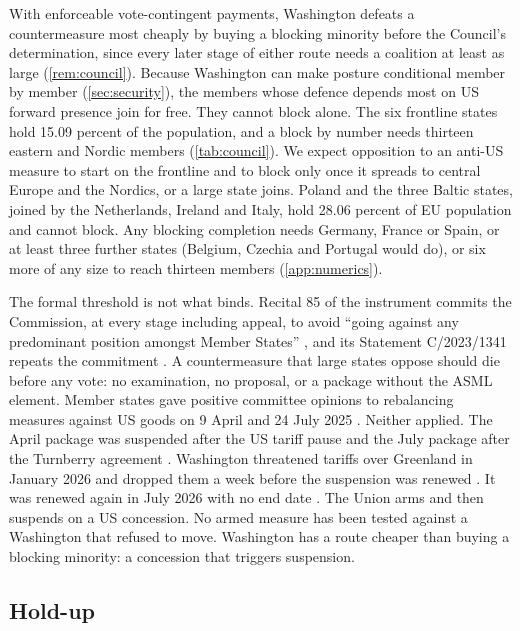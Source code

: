 With enforceable vote-contingent payments, Washington defeats a countermeasure most cheaply by buying a blocking minority before the Council's determination, since every later stage of either route needs a coalition at least as large (\cref{rem:council}). Because Washington can make posture conditional member by member (\cref{sec:security}), the members whose defence depends most on US forward presence join for free. They cannot block alone. The six frontline states hold 15.09 percent of the population, and a block by number needs thirteen eastern and Nordic members (\cref{tab:council}). We expect opposition to an anti-US measure to start on the frontline and to block only once it spreads to central Europe and the Nordics, or a large state joins. Poland and the three Baltic states, joined by the Netherlands, Ireland and Italy, hold 28.06 percent of EU population \citep{council2025population} and cannot block. Any blocking completion needs Germany, France or Spain, or at least three further states (Belgium, Czechia and Portugal would do), or six more of any size to reach thirteen members (\cref{app:numerics}).

The formal threshold is not what binds. Recital 85 of the instrument commits the Commission, at every stage including appeal, to avoid ``going against any predominant position amongst Member States'' \citep{eu2023aci}, and its Statement C/2023/1341 repeats the commitment \citep{commission2023acistatement}. A countermeasure that large states oppose should die before any vote: no examination, no proposal, or a package without the ASML element. Member states gave positive committee opinions to rebalancing measures against US goods on 9 April and 24 July 2025 \citep{commission2025usstatement, commission2025rebalancing1564}. Neither applied. The April package was suspended after the US tariff pause and the July package after the Turnberry agreement \citep{commission2025suspension786, commission2025suspension1727}. Washington threatened tariffs over Greenland in January 2026 \citep{dazio2026greenland} and dropped them a week before the suspension was renewed \citep{ttnews2026greenland, tbc2026summaryjan}. It was renewed again in July 2026 with no end date \citep{commission2026suspension1893}. The Union arms and then suspends on a US concession. No armed measure has been tested against a Washington that refused to move. Washington has a route cheaper than buying a blocking minority: a concession that triggers suspension.

\subsection{Hold-up}\label{sec:holdup}

